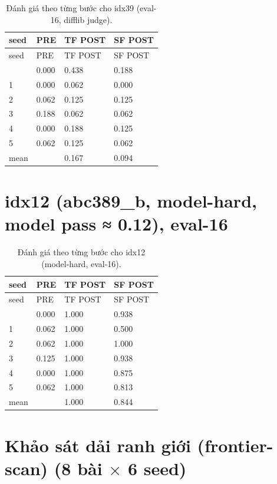 \begin{longtable}{llll}
\caption{Đánh giá theo từng bước cho idx39 (eval-16, difflib judge).}\\
\toprule
seed & PRE & TF POST & SF POST \\
\midrule
\endfirsthead
\toprule
seed & PRE & TF POST & SF POST \\
\midrule
\endhead
\bottomrule
\endfoot
0 & 0.000 & 0.438 & 0.188 \\
1 & 0.000 & 0.062 & 0.000 \\
2 & 0.062 & 0.125 & 0.125 \\
3 & 0.188 & 0.062 & 0.062 \\
4 & 0.000 & 0.188 & 0.125 \\
5 & 0.062 & 0.125 & 0.062 \\
mean & & 0.167 & 0.094 \\
\end{longtable}

\section{idx12 (abc389\_b, model-hard, model pass ≈ 0.12), eval-16}\label{e.2-idx12-abc389_b-model-hard-model-pass-0.12-eval-16}

\begin{longtable}{llll}
\caption{Đánh giá theo từng bước cho idx12 (model-hard, eval-16).}\\
\toprule
seed & PRE & TF POST & SF POST \\
\midrule
\endfirsthead
\toprule
seed & PRE & TF POST & SF POST \\
\midrule
\endhead
\bottomrule
\endfoot
0 & 0.000 & 1.000 & 0.938 \\
1 & 0.062 & 1.000 & 0.500 \\
2 & 0.062 & 1.000 & 1.000 \\
3 & 0.125 & 1.000 & 0.938 \\
4 & 0.000 & 1.000 & 0.875 \\
5 & 0.062 & 1.000 & 0.813 \\
mean & & 1.000 & 0.844 \\
\end{longtable}

\section{Khảo sát dải ranh giới (frontier-scan) (8 bài $\times$ 6 seed)}\label{e.3-frontier-scan-comprehensive-evaluations}

